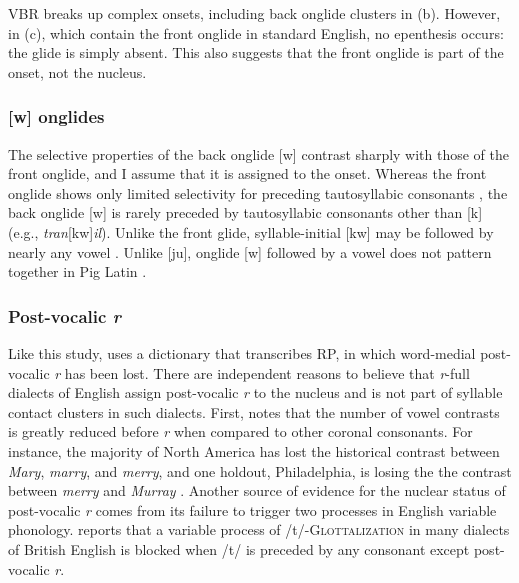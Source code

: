 \noindent
VBR breaks up complex onsets, including back onglide clusters in (\nextx b). However, in (\nextx c), which contain the front onglide in standard English, no epenthesis occurs: the glide is simply absent. This also suggests that the front onglide is part of the onset, not the nucleus. 


\subsubsection{[w] onglides}

The selective properties of the back onglide [w] contrast sharply with those of the front onglide, and I assume that it is assigned to the onset. Whereas the front onglide shows only limited selectivity for preceding tautosyllabic consonants \citep{Davis1995,Kaye1996}, the back onglide [w] is rarely preceded by tautosyllabic consonants other than [k] (e.g., \emph{tran}[kw]\emph{il}). Unlike the front glide, syllable-initial [kw] may be followed by nearly any vowel \citep[][161]{Davis1995}. Unlike [ju\lm], onglide [w] followed by a vowel does not pattern together in Pig Latin \citep[][166]{Davis1995}.


\subsubsection{Post-vocalic \emph{r}}

Like this study, \citet{Pierrehumbert1994} uses a dictionary that transcribes RP, in which word-medial post-vocalic \emph{r} has been lost. There are independent reasons to believe that \emph{r}-full dialects of English assign post-vocalic \emph{r} to the nucleus and is not part of syllable contact clusters in such dialects. First, \citet[][255]{Harris1994} notes that the number of vowel contrasts is greatly reduced before \emph{r} when compared to other coronal consonants. For instance, the majority of North America has lost the historical contrast between \emph{Mary}, \emph{marry}, and \emph{merry}, and one holdout, Philadelphia, is losing the the contrast between \emph{merry} and \emph{Murray} \citep[14f.]{ANAE}. Another source of evidence for the nuclear status of post-vocalic \emph{r} comes from its failure to trigger two processes in English variable phonology. \citeauthor{Harris1994} reports that a variable process of /t/-\textsc{Glottalization} in many dialects of British English is blocked when /t/ is preceded by any consonant except post-vocalic \emph{r}.

